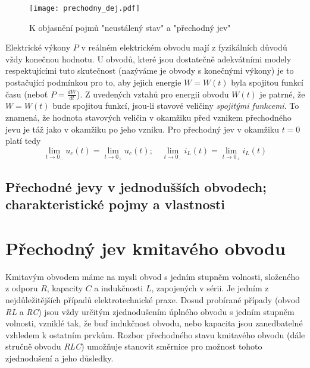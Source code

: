     \begin{figure}[ht!]
       \centering
       \texttt{[image: prechodny\_dej.pdf]}
       \caption[Přechodný jev]{K objasnění pojmů "neustálený stav" a "přechodný jev"}
       \label{TEO:fig_prechodny_dej}
    \end{figure}

    Elektrické výkony $P$ v reálném elektrickém obvodu mají z fyzikálních důvodů vždy konečnou 
    hodnotu. U obvodů, které jsou dostatečně adekvátními modely respektujícími tuto skutečnost 
    (nazýváme je obvody s konečnými výkony) je to postačující podmínkou pro to, aby jejich energie 
    $W = W(t)$ byla spojitou funkcí času (neboť $P = \frac{dW}{dt}$). Z uvedených vztahů pro 
    energii obvodu $W(t)$ je patrné, že $W = W(t)$ bude spojitou funkcí, jsou-li stavové veličiny 
    \emph{spojitými funkcemi}. To znamená, že hodnota stavových veličin v okamžiku před vznikem 
    přechodného jevu je táž jako v okamžiku po jeho vzniku. Pro přechodný jev v okamžiku $t=0$ 
    platí tedy
    \begin{equation}\label{TEO:eq_spojite_fce}
      \lim_{t\rightarrow0_-}u_c(t)= \lim_{t\rightarrow0_+}u_c(t); \quad  
      \lim_{t\rightarrow0_-}i_L(t)= \lim_{t\rightarrow0_+}i_L(t)
    \end{equation}

     \subsection{Přechodné jevy v jednodušších obvodech; charakteristické pojmy a vlastnosti}
            

            
  \section{Přechodný jev kmitavého obvodu}
    Kmitavým obvodem máme na mysli obvod s jedním stupněm volnosti, složeného z odporu $R$,
    kapacity $C$ a indukčnosti $L$, zapojených v sérii. Je jedním z nejdůležitějších případů
    elektrotechnické praxe. Dosud probírané případy (obvod \emph{RL} a \emph{RC}) jsou vždy určitým
    zjednodušením úplného obvodu s jedním stupněm volnosti, vzniklé tak, že buď indukčnost obvodu,
    nebo kapacita jsou zanedbatelné vzhledem k ostatním prvkům. Rozbor přechodného stavu kmitavého
    obvodu (dále stručně obvodu \emph{RLC}) umožňuje stanovit směrnice pro možnost tohoto
    zjednodušení a jeho důsledky.
    
